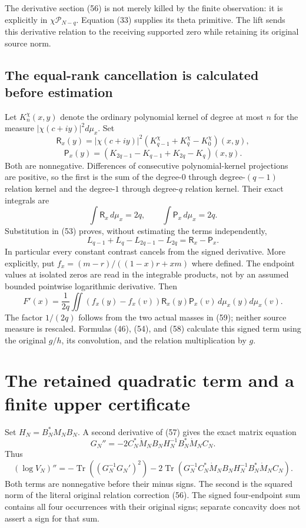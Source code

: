\documentclass[11pt]{article}
\begin{document}
The derivative section (56) is not merely killed by the finite observation: it is explicitly in $\chi\mathcal P_{N-q}$. Equation (33) supplies its theta primitive. The lift sends this derivative relation to the receiving supported zero while retaining its original source norm.

\subsection{The equal-rank cancellation is calculated before estimation}
Let $K_n^{\chi}(x,y)$ denote the ordinary polynomial kernel of degree at most $n$ for the measure $|\chi(c+iy)|^2d\mu_x$. Set
\[
 \mathsf R_x(y)=|\chi(c+iy)|^2
       (K_{q-1}^{\chi}+K_q^{\chi}-K_0^{\chi})(x,y),
\]
\[
 \mathsf P_x(y)=
       (K_{2q-1}-K_{q-1}+K_{2q}-K_q)(x,y).
 \tag{58}
\]
Both are nonnegative. Differences of consecutive polynomial-kernel projections are positive, so the first is the sum of the degree-$0$ through degree-$(q-1)$ relation kernel and the degree-$1$ through degree-$q$ relation kernel. Their exact integrals are
\[
 \int\mathsf R_x\,d\mu_x=2q,
 \qquad\int\mathsf P_x\,d\mu_x=2q.
 \tag{59}
\]
Substitution in (53) proves, without estimating the terms independently,
\[
 L_{q-1}+L_q-L_{2q-1}-L_{2q}=\mathsf R_x-\mathsf P_x.
 \tag{60}
\]
In particular every constant contrast cancels from the signed derivative. More explicitly, put $f_x=(m-r)/((1-x)r+x m)$ where defined. The endpoint values at isolated zeros are read in the integrable products, not by an assumed bounded pointwise logarithmic derivative. Then
\[
 F'(x)=\frac1{2q}\iint
       (f_x(y)-f_x(v))\mathsf R_x(y)\mathsf P_x(v)
       \,d\mu_x(y)d\mu_x(v).
 \tag{61}
\]
The factor $1/(2q)$ follows from the two actual masses in (59); neither source measure is rescaled. Formulas (46), (54), and (58) calculate this signed term using the original $g/h$, its convolution, and the relation multiplication by $g$.

\section{The retained quadratic term and a finite upper certificate}
Set $H_N=B_N^*M_NB_N$. A second derivative of (57) gives the exact matrix equation
\[
 \boxed{G_N''=-2C_N^*\dot M_NB_NH_N^{-1}B_N^*\dot M_NC_N.}
 \tag{62}
\]
Thus
\[
 (\log V_N)''
 =-\operatorname{Tr}((G_N^{-1}G_N')^2)
  -2\operatorname{Tr}(G_N^{-1}C_N^*\dot M_NB_NH_N^{-1}
                     B_N^*\dot M_NC_N).
 \tag{63}
\]
Both terms are nonnegative before their minus signs. The second is the squared norm of the literal original relation correction (56). The signed four-endpoint sum contains all four occurrences with their original signs; separate concavity does not assert a sign for that sum.
\end{document}

